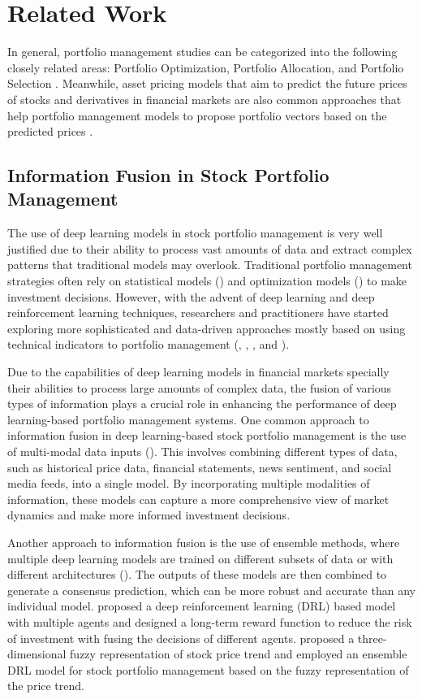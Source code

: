 \section{Related Work}
In general, portfolio management studies can be categorized into the following closely related areas: Portfolio Optimization, Portfolio Allocation, and Portfolio Selection \cite{ozbayoglu2020deep}. Meanwhile, asset pricing models that aim to predict the future prices of stocks and derivatives in financial markets are also common approaches that help portfolio management models to propose portfolio vectors based on the predicted prices \cite{nazareth2023financial}.
\subsection{Information Fusion in Stock Portfolio Management}

The use of deep learning models in stock portfolio management is very well justified due to their ability to process vast amounts of data and extract complex patterns that traditional models may overlook. Traditional portfolio management strategies often rely on statistical models (\citet{li2012pamr}) and optimization models (\citet{pennanen2012introduction}) to make investment decisions. However, with the advent of deep learning and deep reinforcement learning techniques, researchers and practitioners have started exploring more sophisticated and data-driven approaches mostly based on using technical indicators to portfolio management (\citet{ayala2021technical}, \citet{agrawal2022stock}, \citet{taghian2021reinforcement}, and \citet{taghian2022learning}).

Due to the capabilities of deep learning models in financial markets specially their abilities to process large amounts of complex data, the fusion of various types of information plays a crucial role in enhancing the performance of deep learning-based portfolio management systems. One common approach to information fusion in deep learning-based stock portfolio management is the use of multi-modal data inputs (\citet{asadi4423354multi}). This involves combining different types of data, such as historical price data, financial statements, news sentiment, and social media feeds, into a single model. By incorporating multiple modalities of information, these models can capture a more comprehensive view of market dynamics and make more informed investment decisions.

Another approach to information fusion is the use of ensemble methods, where multiple deep learning models are trained on different subsets of data or with different architectures (\citet{carta2021multi}). The outputs of these models are then combined to generate a consensus prediction, which can be more robust and accurate than any individual model. \citet{lin2022multiagent} proposed a deep reinforcement learning (DRL) based model with multiple agents and designed a long-term reward function to reduce the risk of investment with fusing the decisions of different agents. \citet{hao2023stock} proposed a three-dimensional fuzzy representation of stock price trend and employed an ensemble DRL model for stock portfolio management based on the fuzzy representation of the price trend.

